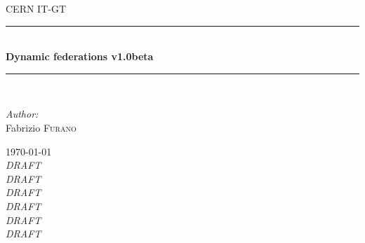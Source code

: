 \documentclass[12pt]{article} %
\begin{document}

\begin{titlepage}

\newcommand{\HRule}{\rule{\linewidth}{0.5mm}} %

\center %

\textsc{\LARGE CERN IT-GT}\\[1.5cm] %

\HRule \\[0.4cm]
{ \huge \bfseries Dynamic federations v1.0beta}\\[0.4cm] %
\HRule \\[1.5cm]

\begin{minipage}{0.4\textwidth}
\begin{flushleft} \large
\emph{Author:}\\
Fabrizio \textsc{Furano} \\ %
\end{flushleft}
\end{minipage}

{\large \today}\\[3cm] %


\emph{DRAFT}\\

\emph{DRAFT}\\

\emph{DRAFT}\\

\emph{DRAFT}\\

\emph{DRAFT}\\

\emph{DRAFT}\\


\vfill %

\end{titlepage}
\end{document}
